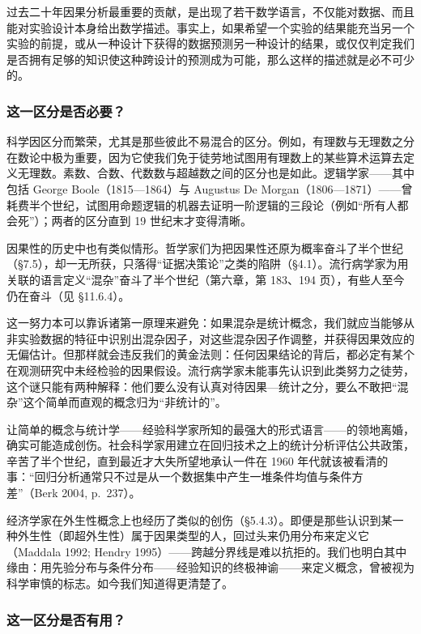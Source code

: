 过去二十年因果分析最重要的贡献，是出现了若干数学语言，不仅能对数据、而且能对实验设计本身给出数学描述。事实上，如果希望一个实验的结果能充当另一个实验的前提，或从一种设计下获得的数据预测另一种设计的结果，或仅仅判定我们是否拥有足够的知识使这种跨设计的预测成为可能，那么这样的描述就是必不可少的。

\subsubsection*{这一区分是否必要？}

科学因区分而繁荣，尤其是那些彼此不易混合的区分。例如，有理数与无理数之分在数论中极为重要，因为它使我们免于徒劳地试图用有理数上的某些算术运算去定义无理数。素数、合数、代数数与超越数之间的区分也是如此。逻辑学家——其中包括 George Boole（1815—1864）与 Augustus De Morgan（1806—1871）——曾耗费半个世纪，试图用命题逻辑的机器去证明一阶逻辑的三段论（例如“所有人都会死”）；两者的区分直到 19 世纪末才变得清晰。

因果性的历史中也有类似情形。哲学家们为把因果性还原为概率奋斗了半个世纪（\S 7.5），却一无所获，只落得“证据决策论”之类的陷阱（\S 4.1）。流行病学家为用关联的语言定义“混杂”奋斗了半个世纪（第六章，第 183、194 页），有些人至今仍在奋斗（见 \S 11.6.4）。

这一努力本可以靠诉诸第一原理来避免：如果混杂是统计概念，我们就应当能够从非实验数据的特征中识别出混杂因子，对这些混杂因子作调整，并获得因果效应的无偏估计。但那样就会违反我们的黄金法则：任何因果结论的背后，都必定有某个在观测研究中未经检验的因果假设。流行病学家未能事先认识到此类努力之徒劳，这个谜只能有两种解释：他们要么没有认真对待因果—统计之分，要么不敢把“混杂”这个简单而直观的概念归为“非统计的”。

让简单的概念与统计学——经验科学家所知的最强大的形式语言——的领地离婚，确实可能造成创伤。社会科学家用建立在回归技术之上的统计分析评估公共政策，辛苦了半个世纪，直到最近才大失所望地承认一件在 1960 年代就该被看清的事：“回归分析通常只不过是从一个数据集中产生一堆条件均值与条件方差”（Berk 2004, p.~237）。

经济学家在外生性概念上也经历了类似的创伤（\S 5.4.3）。即便是那些认识到某一种外生性（即超外生性）属于因果类型的人，回过头来仍用分布来定义它（Maddala 1992; Hendry 1995）——跨越分界线是难以抗拒的。我们也明白其中缘由：用先验分布与条件分布——经验知识的终极神谕——来定义概念，曾被视为科学审慎的标志。如今我们知道得更清楚了。

\subsubsection*{这一区分是否有用？}

